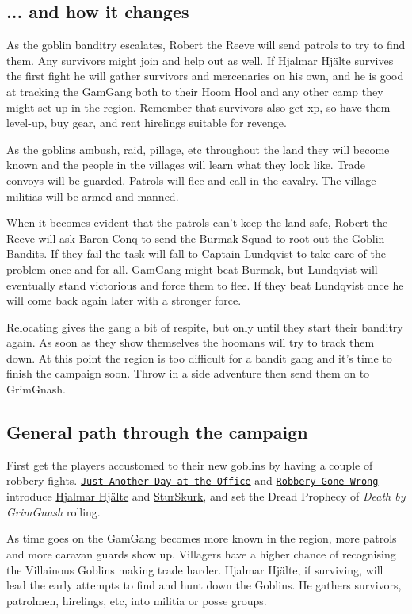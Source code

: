 \subsection*{... and how it changes}

As the goblin banditry escalates, Robert the Reeve will send patrols to try to find them. Any survivors might join and help out as well. If Hjalmar Hjälte survives the first fight he will gather survivors and mercenaries on his own, and he is good at tracking the GamGang both to their Hoom Hool and any other camp they might set up in the region. Remember that survivors also get xp, so have them level-up, buy gear, and rent hirelings suitable for revenge.

As the goblins ambush, raid, pillage, etc throughout the land they will become known and the people in the villages will learn what they look like. Trade convoys will be guarded. Patrols will flee and call in the cavalry. The village militias will be armed and manned.

When it becomes evident that the patrols can't keep the land safe, Robert the Reeve will ask Baron Conq to send the Burmak Squad to root out the Goblin Bandits. If they fail the task will fall to Captain Lundqvist to take care of the problem once and for all. GamGang might beat Burmak, but Lundqvist will eventually stand victorious and force them to flee. If they beat Lundqvist once he will come back again later with a stronger force.

Relocating gives the gang a bit of respite, but only until they start their banditry again. As soon as they show themselves the hoomans will try to track them down. At this point the region is too difficult for a bandit gang and it's time to finish the campaign soon. Throw in a side adventure then send them on to GrimGnash.


\subsection*{General path through the campaign}

First get the players accustomed to their new goblins by having a couple of robbery fights. \hyperref[00justanotherdayattheoffice]{\texttt{Just Another Day at the Office}} and \hyperref[01robberygonewrong]{\texttt{Robbery Gone Wrong}} introduce \hyperref[hjalmarhjalte]{Hjalmar Hjälte} and \hyperref[sturskurkboss]{SturSkurk}, and set the Dread Prophecy of \emph{Death by GrimGnash} rolling.

As time goes on the GamGang becomes more known in the region, more patrols and more caravan guards show up. Villagers have a higher chance of recognising the Villainous Goblins making trade harder. Hjalmar Hjälte, if surviving, will lead the early attempts to find and hunt down the Goblins. He gathers survivors, patrolmen, hirelings, etc, into militia or posse groups.

